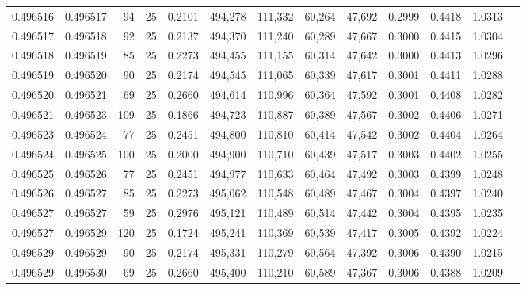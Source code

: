 \begin{tabular}{rrrrrrrrrrrrr}
0.496516 & 0.496517 &    94 &  25 &                                     0.2101 & 494,278 & 111,332 &  60,264 &  47,692 & 0.2999 & 0.4418 & 1.0313 \\
0.496517 & 0.496518 &    92 &  25 &                                     0.2137 & 494,370 & 111,240 &  60,289 &  47,667 & 0.3000 & 0.4415 & 1.0304 \\
0.496518 & 0.496519 &    85 &  25 &                                     0.2273 & 494,455 & 111,155 &  60,314 &  47,642 & 0.3000 & 0.4413 & 1.0296 \\
0.496519 & 0.496520 &    90 &  25 &                                     0.2174 & 494,545 & 111,065 &  60,339 &  47,617 & 0.3001 & 0.4411 & 1.0288 \\
0.496520 & 0.496521 &    69 &  25 &                                     0.2660 & 494,614 & 110,996 &  60,364 &  47,592 & 0.3001 & 0.4408 & 1.0282 \\
0.496521 & 0.496523 &   109 &  25 &                                     0.1866 & 494,723 & 110,887 &  60,389 &  47,567 & 0.3002 & 0.4406 & 1.0271 \\
0.496523 & 0.496524 &    77 &  25 &                                     0.2451 & 494,800 & 110,810 &  60,414 &  47,542 & 0.3002 & 0.4404 & 1.0264 \\
0.496524 & 0.496525 &   100 &  25 &                                     0.2000 & 494,900 & 110,710 &  60,439 &  47,517 & 0.3003 & 0.4402 & 1.0255 \\
0.496525 & 0.496526 &    77 &  25 &                                     0.2451 & 494,977 & 110,633 &  60,464 &  47,492 & 0.3003 & 0.4399 & 1.0248 \\
0.496526 & 0.496527 &    85 &  25 &                                     0.2273 & 495,062 & 110,548 &  60,489 &  47,467 & 0.3004 & 0.4397 & 1.0240 \\
0.496527 & 0.496527 &    59 &  25 &                                     0.2976 & 495,121 & 110,489 &  60,514 &  47,442 & 0.3004 & 0.4395 & 1.0235 \\
0.496527 & 0.496529 &   120 &  25 &                                     0.1724 & 495,241 & 110,369 &  60,539 &  47,417 & 0.3005 & 0.4392 & 1.0224 \\
0.496529 & 0.496529 &    90 &  25 &                                     0.2174 & 495,331 & 110,279 &  60,564 &  47,392 & 0.3006 & 0.4390 & 1.0215 \\
0.496529 & 0.496530 &    69 &  25 &                                     0.2660 & 495,400 & 110,210 &  60,589 &  47,367 & 0.3006 & 0.4388 & 1.0209 \\

\end{tabular}
